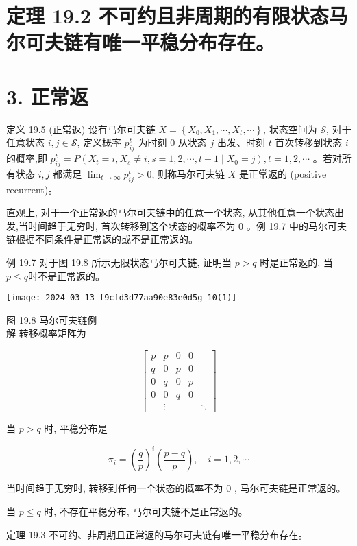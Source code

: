 \documentclass[10pt]{article}
\begin{document}
\begin{CJK*}{UTF8}{bsmi}
\section*{定理 19.2 不可约且非周期的有限状态马尔可夫链有唯一平稳分布存在。}
\section*{3. 正常返}
定义 19.5 (正常返) 设有马尔可夫链 $X=\left\{X_{0}, X_{1}, \cdots, X_{t}, \cdots\right\}$, 状态空间为 $\mathcal{S}$, 对于任意状态 $i, j \in \mathcal{S}$, 定义概率 $p_{i j}^{t}$ 为时刻 0 从状态 $j$ 出发、时刻 $t$ 首次转移到状态 $i$ 的概率,即 $p_{i j}^{t}=P\left(X_{t}=i, X_{s} \neq i, s=1,2, \cdots, t-1 \mid X_{0}=j\right), t=1,2, \cdots$ 。若对所有状态 $i, j$ 都满足 $\lim _{t \rightarrow \infty} p_{i j}^{t}>0$, 则称马尔可夫链 $X$ 是正常返的 (positive recurrent)。

直观上, 对于一个正常返的马尔可夫链中的任意一个状态, 从其他任意一个状态出发,当时间趋于无穷时, 首次转移到这个状态的概率不为 0 。例 19.7 中的马尔可夫链根据不同条件是正常返的或不是正常返的。

例 19.7 对于图 19.8 所示无限状态马尔可夫链, 证明当 $p>q$ 时是正常返的, 当 $p \leqslant q$时不是正常返的。

\begin{center}
\texttt{[image: 2024\_03\_13\_f9cfd3d77aa90e83e0d5g-10(1)]}
\end{center}

图 19.8 马尔可夫链例\\
解 转移概率矩阵为

$$
\left[\begin{array}{ccccc}
p & p & 0 & 0 & \\
q & 0 & p & 0 & \\
0 & q & 0 & p & \\
0 & 0 & q & 0 & \\
& \vdots & & & \ddots
\end{array}\right]
$$

当 $p>q$ 时, 平稳分布是

$$
\pi_{i}=\left(\frac{q}{p}\right)^{i}\left(\frac{p-q}{p}\right), \quad i=1,2, \cdots
$$

当时间趋于无穷时, 转移到任何一个状态的概率不为 0 , 马尔可夫链是正常返的。

当 $p \leqslant q$ 时, 不存在平稳分布, 马尔可夫链不是正常返的。

定理 19.3 不可约、非周期且正常返的马尔可夫链有唯一平稳分布存在。


\end{CJK*}
\end{document}

